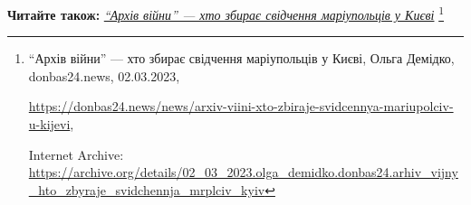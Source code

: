  
 
 
 
 


\textbf{Читайте також:} \href{https://archive.org/details/02_03_2023.olga_demidko.donbas24.arhiv_vijny_hto_zbyraje_svidchennja_mrplciv_kyiv}{\emph{\enquote{Архів війни} — хто збирає свідчення маріупольців у Києві}}%
\footnote{\enquote{Архів війни} — хто збирає свідчення маріупольців у Києві, Ольга Демідко, donbas24.news, 02.03.2023, \par%
\url{https://donbas24.news/news/arxiv-viini-xto-zbiraje-svidcennya-mariupolciv-u-kijevi}, \par%
Internet Archive: \url{https://archive.org/details/02_03_2023.olga_demidko.donbas24.arhiv_vijny_hto_zbyraje_svidchennja_mrplciv_kyiv}%
}
